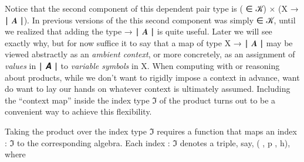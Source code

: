 \ccpad
Notice that the second component of this dependent pair type is ( \af ∈ \ab 𝒦) \af × (\ab X \as → \af ∣ \ab 𝑨 \af ∣). In previous versions of the \ualib this second component was simply  \af ∈ \ab 𝒦, until we realized that adding the type  \as → \af ∣ \ab 𝑨 \af ∣ is quite useful. Later we will see exactly why, but for now suffice it to say that a map of type \ab X \as → \af ∣ \ab 𝑨 \af ∣ may be viewed abstractly as an \emph{ambient context}, or more concretely, as an assignment of \emph{values} in \af ∣ \ab 𝑨 \af ∣ to \emph{variable symbols} in \ab X.  When computing with or reasoning about products, while we don't want to rigidly impose a context in advance, want do want to lay our hands on whatever context is ultimately assumed.  Including the ``context map'' inside the index type \af ℑ of the product turns out to be a convenient way to achieve this flexibility.

Taking the product over the index type \af ℑ requires a function that maps an index  \as : \af ℑ to the corresponding algebra. Each index  \as : \af ℑ denotes a triple, say, ( , \ab p , \ab h), where\\[-4pt]

